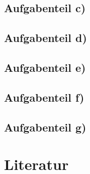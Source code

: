         \subsection{Aufgabenteil c)}


        \subsection{Aufgabenteil d)}


        \subsection{Aufgabenteil e)}


        \subsection{Aufgabenteil f)}


        \subsection{Aufgabenteil g)}

    \section{Literatur}

